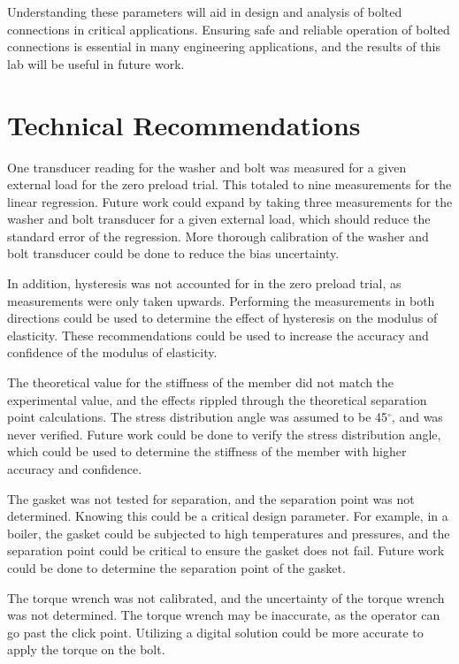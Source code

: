 Understanding these parameters will aid in design and analysis of bolted connections in critical applications. Ensuring safe and reliable operation of bolted connections is essential in many engineering applications, and the results of this lab will be useful in future work.

\section{Technical Recommendations}
One transducer reading for the washer and bolt was measured for a given external load for the zero preload trial. This totaled to nine measurements for the linear regression. Future work could expand by taking three measurements for the washer and bolt transducer for a given external load, which should reduce the standard error of the regression. More thorough calibration of the washer and bolt transducer could be done to reduce the bias uncertainty.

In addition, hysteresis was not accounted for in the zero preload trial, as measurements were only taken upwards. Performing the measurements in both directions could be used to determine the effect of hysteresis on the modulus of elasticity. These recommendations could be used to increase the accuracy and confidence of the modulus of elasticity.

The theoretical value for the stiffness of the member did not match the experimental value, and the effects rippled through the theoretical separation point calculations. The stress distribution angle was assumed to be 45$^\circ$, and was never verified. Future work could be done to verify the stress distribution angle, which could be used to determine the stiffness of the member with higher accuracy and confidence.

The gasket was not tested for separation, and the separation point was not determined. Knowing this could be a critical design parameter. For example, in a boiler, the gasket could be subjected to high temperatures and pressures, and the separation point could be critical to ensure the gasket does not fail. Future work could be done to determine the separation point of the gasket.

The torque wrench was not calibrated, and the uncertainty of the torque wrench was not determined. The torque wrench may be inaccurate, as the operator can go past the click point. Utilizing a digital solution could be more accurate to apply the torque on the bolt.